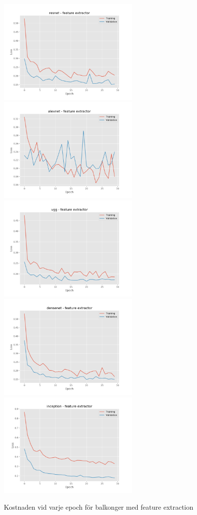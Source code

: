 \documentclass[]{kththesis}
\begin{document}
\printbibliography[heading=bibintoc]
\appendix
  \begin{figure}[h]
    \includegraphics[width=7cm]{b_l_resnet_fe}
    \includegraphics[width=7cm]{b_l_alexnet_fe}
    \includegraphics[width=7cm]{b_l_vgg_fe}
    \includegraphics[width=7cm]{b_l_densenet_fe}
    \includegraphics[width=7cm]{b_l_inception_fe}
    \caption{Kostnaden vid varje epoch för balkonger med feature extraction}
    \label{fig:b_l_1}
  \end{figure}
  
\end{document}
